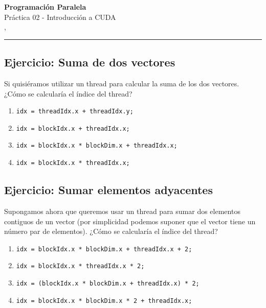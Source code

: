 



\begin{center}
    \LARGE\textbf{Programación Paralela} \\
    \Large{Práctica 02 - Introducción a CUDA} \\
    \normalsize{\currentsemester, \currentyear} \\
    \vspace{1em}
    \hrule
\end{center}

\setcounter{section}{2}



\newpage

\tableofcontents

\newpage

\subsection{Ejercicio: Suma de dos vectores}

Si quisiéramos utilizar un thread para calcular la suma de los dos vectores. ¿Cómo se calcularía el índice del thread?

\begin{enumerate}[label=\roman*.]
  \item \texttt{idx = threadIdx.x + threadIdx.y;}
  \item \texttt{idx = blockIdx.x + threadIdx.x;}
  \item \texttt{idx = blockIdx.x * blockDim.x + threadIdx.x;}
  \item \texttt{idx = blockIdx.x * threadIdx.x;}
\end{enumerate}

\subsection{Ejercicio: Sumar elementos adyacentes}

Supongamos ahora que queremos usar un thread para sumar dos elementos contiguos de un vector (por simplicidad podemos
suponer que el vector tiene un número par de elementos). ¿Cómo se calcularía el índice del thread?

\begin{enumerate}[label=\roman*.]
  \item \texttt{idx = blockIdx.x * blockDim.x + threadIdx.x + 2;}
  \item \texttt{idx = blockIdx.x * threadIdx.x * 2;}
  \item \texttt{idx = (blockIdx.x * blockDim.x + threadIdx.x) * 2;}
  \item \texttt{idx = blockIdx.x * blockDim.x * 2 + threadIdx.x;}
\end{enumerate}

